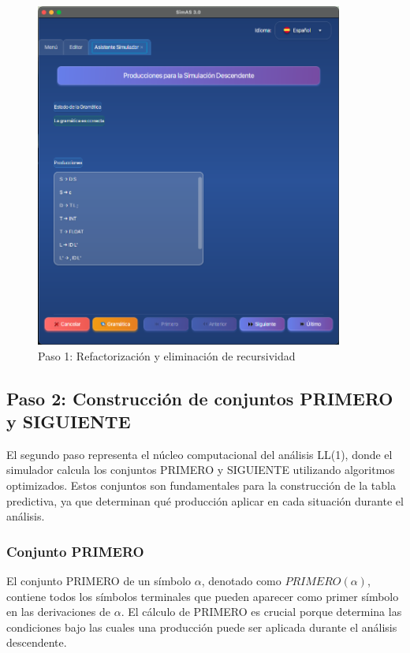 \needspace{8cm}
\begin{figure}[H]
    \centering
    \includegraphics[width=0.9\textwidth]{figuras/simulador/paso1_recursividad_factorizacion.png}
    \caption{Paso 1: Refactorización y eliminación de recursividad}
    \label{fig:paso1_refactorizacion}
\end{figure}

\subsection{Paso 2: Construcción de conjuntos PRIMERO y SIGUIENTE}

El segundo paso representa el núcleo computacional del análisis LL(1), donde el simulador calcula los conjuntos PRIMERO y SIGUIENTE utilizando algoritmos optimizados. Estos conjuntos son fundamentales para la construcción de la tabla predictiva, ya que determinan qué producción aplicar en cada situación durante el análisis.

\subsubsection{Conjunto PRIMERO}

El conjunto PRIMERO de un símbolo $\alpha$, denotado como $PRIMERO(\alpha)$, contiene todos los símbolos terminales que pueden aparecer como primer símbolo en las derivaciones de $\alpha$. El cálculo de PRIMERO es crucial porque determina las condiciones bajo las cuales una producción puede ser aplicada durante el análisis descendente.

